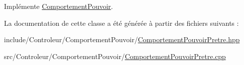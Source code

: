 Implémente \hyperlink{class_comportement_pouvoir_a8b8f4e753291ab73ab0016106f3948ff}{Comportement\-Pouvoir}.



La documentation de cette classe a été générée à partir des fichiers suivants \-:\begin{DoxyCompactItemize}
\item 
include/\-Controleur/\-Comportement\-Pouvoir/\hyperlink{_comportement_pouvoir_pretre_8hpp}{Comportement\-Pouvoir\-Pretre.\-hpp}\item 
src/\-Controleur/\-Comportement\-Pouvoir/\hyperlink{_comportement_pouvoir_pretre_8cpp}{Comportement\-Pouvoir\-Pretre.\-cpp}\end{DoxyCompactItemize}
